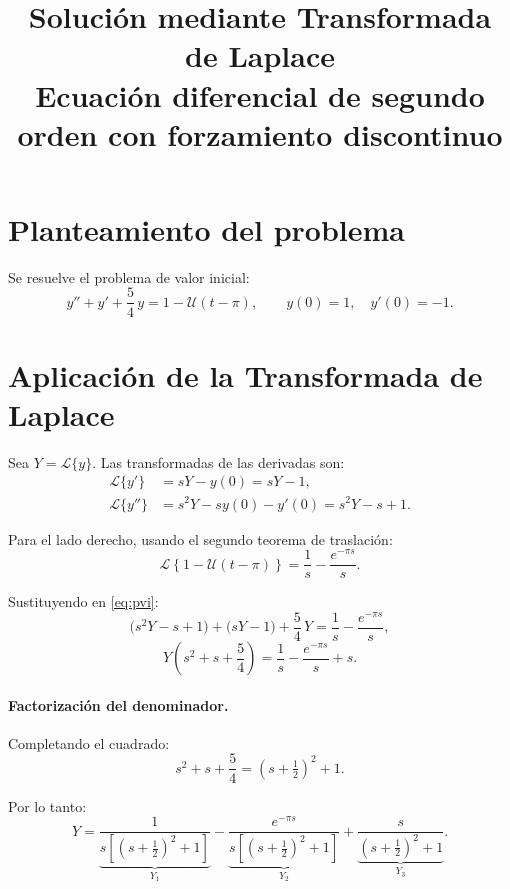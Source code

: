 \documentclass[12pt, a4paper]{article}
\title{\textbf{Solución mediante Transformada de Laplace}\\[4pt]
       \large Ecuación diferencial de segundo orden con forzamiento discontinuo}
\date{}
\newcommand{\Lap}{\mathcal{L}}              %
\newcommand{\Uu}{\mathcal{U}}              %
\newcommand{\half}{\tfrac{1}{2}}
\begin{document}
\maketitle
\thispagestyle{empty}

\section{Planteamiento del problema}

Se resuelve el problema de valor inicial:
\begin{equation}
  y'' + y' + \frac{5}{4}\,y = 1 - \Uu(t-\pi),
  \qquad y(0) = 1,\quad y'(0) = -1.
  \label{eq:pvi}
\end{equation}

\section{Aplicación de la Transformada de Laplace}

Sea $Y = \Lap\{y\}$. Las transformadas de las derivadas son:
\begin{align*}
  \Lap\{y'\}  &= sY - y(0)         = sY - 1, \\
  \Lap\{y''\} &= s^{2}Y - sy(0) - y'(0) = s^{2}Y - s + 1.
\end{align*}

Para el lado derecho, usando el segundo teorema de traslación:
\[
  \Lap\!\left\{1 - \Uu(t-\pi)\right\} = \frac{1}{s} - \frac{e^{-\pi s}}{s}.
\]

Sustituyendo en \eqref{eq:pvi}:
\[
  \bigl(s^{2}Y - s + 1\bigr) + \bigl(sY - 1\bigr) + \frac{5}{4}\,Y
  = \frac{1}{s} - \frac{e^{-\pi s}}{s},
\]
\[
  Y\!\left(s^{2} + s + \frac{5}{4}\right) = \frac{1}{s} - \frac{e^{-\pi s}}{s} + s.
\]

\paragraph{Factorización del denominador.}
Completando el cuadrado:
\[
  s^{2} + s + \frac{5}{4}
  = \left(s + \half\right)^{2} + 1.
\]

Por lo tanto:
\begin{equation}
  Y = \underbrace{\frac{1}{s\!\left[\!\left(s+\half\right)^{2}+1\right]}}_{Y_1}
    - \underbrace{\frac{e^{-\pi s}}{s\!\left[\!\left(s+\half\right)^{2}+1\right]}}_{Y_2}
    + \underbrace{\frac{s}{\left(s+\half\right)^{2}+1}}_{Y_3}.
  \label{eq:Y}
\end{equation}
\end{document}
